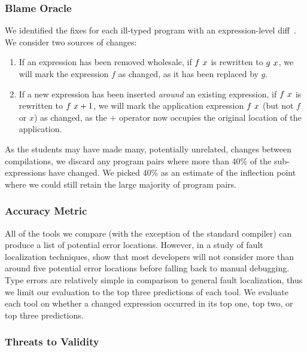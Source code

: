 \subsubsection{Blame Oracle}
We identified the fixes for each ill-typed program with an
expression-level diff~\citep{Lempsink2009-xf}.
%
We consider two sources of changes:
%
\begin{enumerate}
\item If an expression has been removed wholesale, \eg if $f\ x$
  is rewritten to $g\ x$, we will mark the expression $f$ as
  changed, as it has been replaced by $g$.
\item If a new expression has been inserted \emph{around} an existing
  expression, \eg if $f\ x$ is rewritten to
  $f\ x + 1$, we will mark the application expression
  $f\ x$ (but not $f$ or $x$) as changed, as the $+$ operator now
  occupies the original location of the application.
\end{enumerate}
%
As the students may have made many, potentially unrelated, changes
between compilations, we discard any program pairs where more than 40\%
of the sub-expressions have changed.
%
We picked 40\% as an estimate of the inflection point where we could
still retain the large majority of program pairs.


\subsubsection{Accuracy Metric}
All of the tools we compare (with the exception of the standard \ocaml
compiler) can produce a list of potential error locations. 
%
However, in a study of fault localization techniques,
\citet{Kochhar2016-oc} show that most developers will not consider more
than around five potential error locations before falling back to manual
debugging.
%
Type errors are relatively simple in comparison to general fault
localization, thus we limit our evaluation to the top three predictions
of each tool.
%
We evaluate each tool on whether a changed expression occurred in its
top one, top two, or top three predictions.




\subsubsection{Threats to Validity} 

